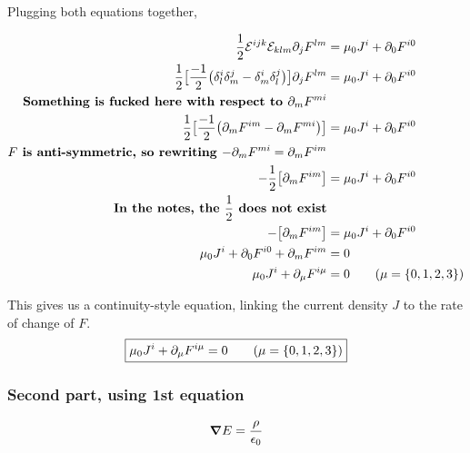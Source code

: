 Plugging both equations together,

\begin{align*}
    \frac{1}{2} \levicevita^{ijk} \levicevita_{klm} \partial_j F^{lm} &=  \mu_0 J^i + \partial_0 F^{i0}  \\
    \frac{1}{2} \big[ 
   \frac{-1}{2} \big(\delta^i_l \delta^j_m - \delta^i_m \delta^j_l\big) \big]
   \partial_j F^{lm} &=  \mu_0 J^i + \partial_0 F^{i0} \\
    \textbf{Something is fucked here with respect to $\partial_m F^{mi}$} \\
    \frac{1}{2} \big[ \frac{-1}{2} \big(
    \partial_m F^{im} - \partial_m F^{mi} \big) \big] &= \mu_0 J^i + \partial_0 F^{i0}   \\
        \textbf{$F$ is anti-symmetric, so rewriting $-\partial_m F^{mi} = \partial_m F^{im}$} \\
    -\frac{1}{2} \big[ \partial_m F^{im} \big] &= \mu_0 J^i + \partial_0 F^{i0}   \\
       \textbf{In the notes, the $\frac{1}{2}$ does not exist} \\
    - \big[ \partial_m F^{im} \big] &= \mu_0 J^i + \partial_0 F^{i0}   \\
    \mu_0 J^i + \partial_0 F^{i0}  + \partial_m F^{im}  &= 0 \\
    \mu_0 J^i + \partial_\mu F^{i\mu} &= 0 \tag{$\mu = \{0, 1, 2, 3 \}$}
\end{align*}

This gives us a continuity-style equation, linking the current density $J$ to
the rate of change of $F$.
\begin{equation}
    \boxed{ \mu_0 J^i + \partial_\mu F^{i\mu} = 0 \tag{$\mu = \{0, 1, 2, 3 \}$} }
\end{equation}


\subsubsection{Second part, using 1st equation}

\begin{align*}
    \grad E = \frac{\rho}{\epsilon_0}
\end{align*}
